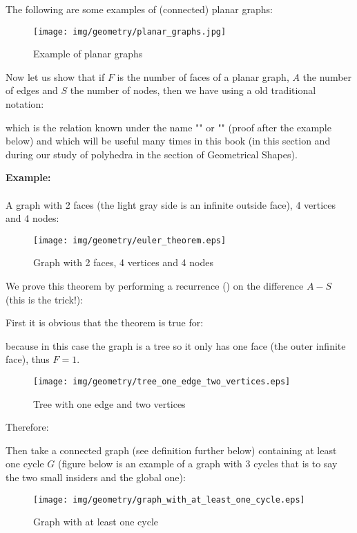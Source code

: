 {\begin{enumerate}
	The following are some examples of (connected) planar graphs:
	\begin{figure}[H]
		\centering
		\texttt{[image: img/geometry/planar\_graphs.jpg]}
		\caption{Example of planar graphs}
	\end{figure}

\begin{theorem}
	Now let us show that if $F$ is the number of faces of a planar graph, $A$ the number of edges and $S$ the number of nodes, then we have using a old traditional notation:
	
which is the relation known under the name "" or "" (proof after the example below) and which will be useful many times in this book (in this section and during our study of polyhedra in the section of Geometrical Shapes).

	\begin{tcolorbox}[colframe=black,colback=white,sharp corners]
\textbf{{\Large {}}Example:}\\\\
A graph with 2 faces (the light gray side is an infinite outside face), 4 vertices and 4 nodes:
\begin{figure}[H]
\centering
\texttt{[image: img/geometry/euler\_theorem.eps]}
\caption{Graph with 2 faces, 4 vertices and 4 nodes}
\end{figure}
	\end{tcolorbox}
\end{theorem}
\begin{dem}
We prove this theorem by performing a recurrence () on the difference $A - S$ (this is the trick!):

First it is obvious that the theorem is true for:
	
because in this case the graph is a tree so it only has one face (the outer infinite face), thus $F=1$.
\begin{figure}[H]
\centering
\texttt{[image: img/geometry/tree\_one\_edge\_two\_vertices.eps]}
\caption{Tree with one edge and two vertices}
\end{figure}
Therefore:
	
Then take a connected graph (see definition further below) containing at least one cycle $G$ (figure below is an example of a graph with $3$ cycles that is to say the two small insiders and the global one):
\begin{figure}[H]
\centering
\texttt{[image: img/geometry/graph\_with\_at\_least\_one\_cycle.eps]}
\caption{Graph with at least one cycle}
\end{figure}


\end{dem}
\end{enumerate}}
